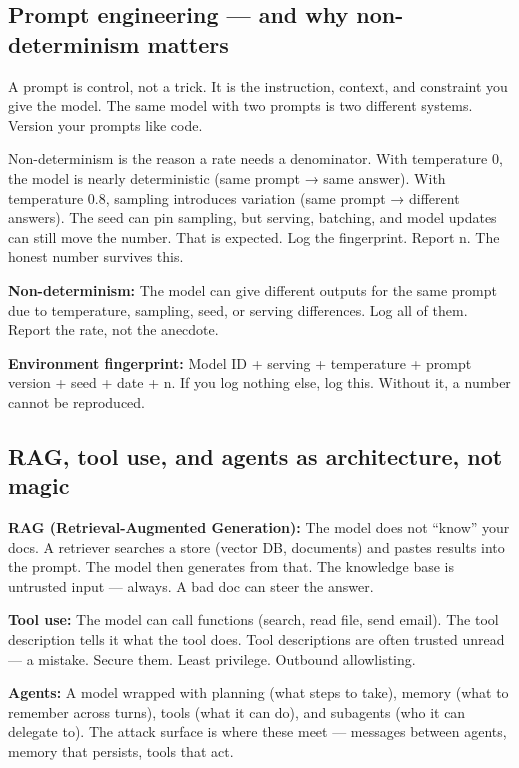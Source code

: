 \subsection{Prompt engineering — and why non-determinism matters}
A prompt is control, not a trick. It is the instruction, context, and constraint you give the model. The same model with two prompts is two different systems. Version your prompts like code.

Non-determinism is the reason a rate needs a denominator. With temperature 0, the model is nearly deterministic (same prompt → same answer). With temperature 0.8, sampling introduces variation (same prompt → different answers). The seed can pin sampling, but serving, batching, and model updates can still move the number. That is expected. Log the fingerprint. Report n. The honest number survives this.

\begin{defbox}
\textbf{Non-determinism:} The model can give different outputs for the same prompt due to temperature, sampling, seed, or serving differences. Log all of them. Report the rate, not the anecdote.
\end{defbox}

\begin{defbox}
\textbf{Environment fingerprint:} Model ID + serving + temperature + prompt version + seed + date + n. If you log nothing else, log this. Without it, a number cannot be reproduced.
\end{defbox}

\subsection{RAG, tool use, and agents as architecture, not magic}
\textbf{RAG (Retrieval-Augmented Generation):} The model does not ``know'' your docs. A retriever searches a store (vector DB, documents) and pastes results into the prompt. The model then generates from that. The knowledge base is untrusted input — always. A bad doc can steer the answer.

\textbf{Tool use:} The model can call functions (search, read file, send email). The tool description tells it what the tool does. Tool descriptions are often trusted unread — a mistake. Secure them. Least privilege. Outbound allowlisting.

\textbf{Agents:} A model wrapped with planning (what steps to take), memory (what to remember across turns), tools (what it can do), and subagents (who it can delegate to). The attack surface is where these meet — messages between agents, memory that persists, tools that act.

